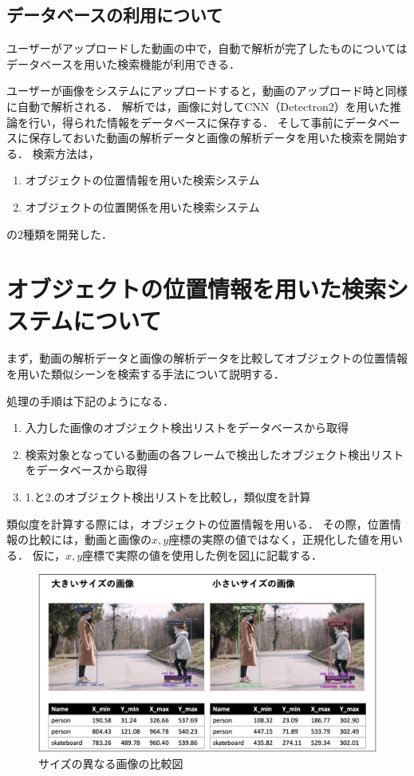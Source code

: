\documentclass[a4j,12pt,dvipdfmx]{jreport}
\begin{document}
\subsection{データベースの利用について}\label{chap3-3-2}
ユーザーがアップロードした動画の中で，自動で解析が完了したものについてはデータベースを用いた検索機能が利用できる．

ユーザーが画像をシステムにアップロードすると，動画のアップロード時と同様に自動で解析される．
解析では，画像に対してCNN（Detectron2）を用いた推論を行い，得られた情報をデータベースに保存する．
そして事前にデータベースに保存しておいた動画の解析データと画像の解析データを用いた検索を開始する．
検索方法は，
\begin{enumerate}
  \item オブジェクトの位置情報を用いた検索システム
  \item オブジェクトの位置関係を用いた検索システム
\end{enumerate}

の2種類を開発した．

\section{オブジェクトの位置情報を用いた検索システムについて}\label{chap3-4}
まず，動画の解析データと画像の解析データを比較してオブジェクトの位置情報を用いた類似シーンを検索する手法について説明する．

処理の手順は下記のようになる．
\begin{enumerate}
  \item 入力した画像のオブジェクト検出リストをデータベースから取得
  \item 検索対象となっている動画の各フレームで検出したオブジェクト検出リストをデータベースから取得
  \item 1.と2.のオブジェクト検出リストを比較し，類似度を計算
\end{enumerate}

類似度を計算する際には，オブジェクトの位置情報を用いる．
その際，位置情報の比較には，動画と画像の$x,y$座標の実際の値ではなく，正規化した値を用いる．
仮に，$x,y$座標で実際の値を使用した例を図\ref{fig:compare}に記載する．

\begin{figure}[H]
  \centering
  \includegraphics[width=13cm]{image/compare.png}
  \caption{サイズの異なる画像の比較図}
  \label{fig:compare}
\end{figure}
\end{document}
